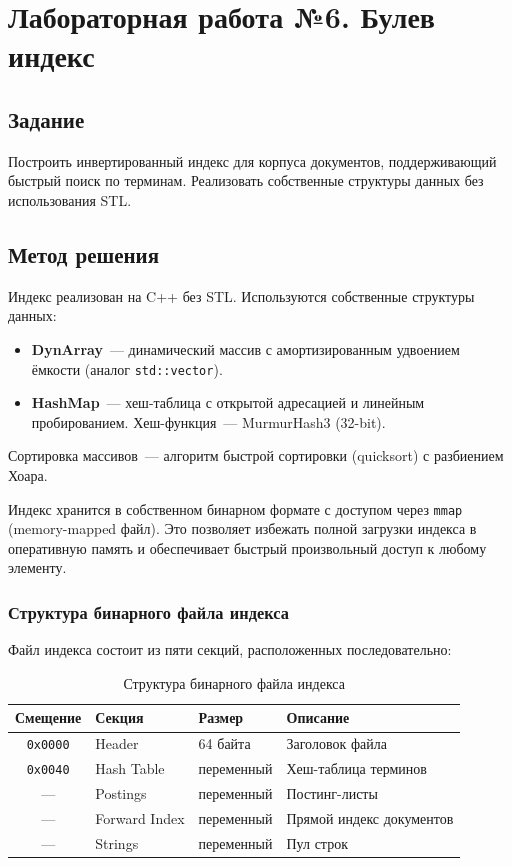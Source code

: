 \documentclass[a4paper,12pt]{article}
\begin{document}
\newpage

\section{Лабораторная работа №6. Булев индекс}

\subsection{Задание}

Построить инвертированный индекс для корпуса документов, поддерживающий быстрый поиск по терминам. Реализовать собственные структуры данных без использования STL.

\subsection{Метод решения}

Индекс реализован на C++ без STL. Используются собственные структуры данных:
\begin{itemize}
    \item \textbf{DynArray}~--- динамический массив с амортизированным удвоением ёмкости (аналог \texttt{std::vector}).
    \item \textbf{HashMap}~--- хеш-таблица с открытой адресацией и линейным пробированием. Хеш-функция~--- MurmurHash3 (32-bit).
\end{itemize}

Сортировка массивов~--- алгоритм быстрой сортировки (quicksort) с разбиением Хоара.

Индекс хранится в собственном бинарном формате с доступом через \texttt{mmap} (memory-mapped файл). Это позволяет избежать полной загрузки индекса в оперативную память и обеспечивает быстрый произвольный доступ к любому элементу.

\subsubsection{Структура бинарного файла индекса}

Файл индекса состоит из пяти секций, расположенных последовательно:

\begin{table}[H]
\centering
\caption{Структура бинарного файла индекса}
\begin{tabular}{clll}
\toprule
\textbf{Смещение} & \textbf{Секция} & \textbf{Размер} & \textbf{Описание} \\
\midrule
\texttt{0x0000} & Header          & 64 байта    & Заголовок файла \\
\texttt{0x0040} & Hash Table      & переменный  & Хеш-таблица терминов \\
---              & Postings        & переменный  & Постинг-листы \\
---              & Forward Index   & переменный  & Прямой индекс документов \\
---              & Strings         & переменный  & Пул строк \\
\bottomrule
\end{tabular}
\end{table}
\end{document}
